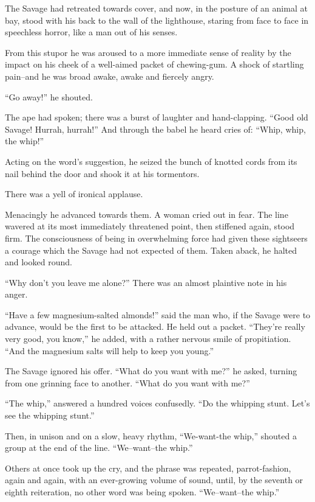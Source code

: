 \documentclass[12pt]{report}
\begin{document}
The Savage had retreated towards cover, and now, in the posture of an
animal at bay, stood with his back to the wall of the lighthouse,
staring from face to face in speechless horror, like a man out of his
senses.

From this stupor he was aroused to a more immediate sense of reality by
the impact on his cheek of a well-aimed packet of chewing-gum. A shock
of startling pain--and he was broad awake, awake and fiercely angry.

``Go away!'' he shouted.

The ape had spoken; there was a burst of laughter and hand-clapping.
``Good old Savage! Hurrah, hurrah!'' And through the babel he heard
cries of: ``Whip, whip, the whip!''

Acting on the word's suggestion, he seized the bunch of knotted cords
from its nail behind the door and shook it at his tormentors.

There was a yell of ironical applause.

Menacingly he advanced towards them. A woman cried out in fear. The line
wavered at its most immediately threatened point, then stiffened again,
stood firm. The consciousness of being in overwhelming force had given
these sightseers a courage which the Savage had not expected of them.
Taken aback, he halted and looked round.

``Why don't you leave me alone?'' There was an almost plaintive note in
his anger.

``Have a few magnesium-salted almonds!'' said the man who, if the Savage
were to advance, would be the first to be attacked. He held out a
packet. ``They're really very good, you know,'' he added, with a rather
nervous smile of propitiation. ``And the magnesium salts will help to
keep you young.''

The Savage ignored his offer. ``What do you want with me?'' he asked,
turning from one grinning face to another. ``What do you want with me?''

``The whip,'' answered a hundred voices confusedly. ``Do the whipping
stunt. Let's see the whipping stunt.''

Then, in unison and on a slow, heavy rhythm, ``We-want-the whip,''
shouted a group at the end of the line. ``We--want--the whip.''

Others at once took up the cry, and the phrase was repeated,
parrot-fashion, again and again, with an ever-growing volume of sound,
until, by the seventh or eighth reiteration, no other word was being
spoken. ``We--want--the whip.''
\end{document}
